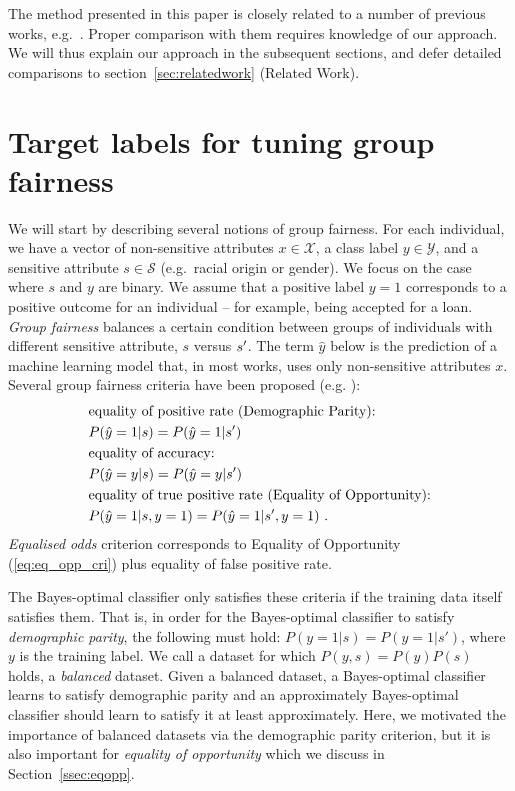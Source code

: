 The method presented in this paper is closely related to a number of previous works,
e.g.\ \citet{kamiran2012data,calders2010three}.
Proper comparison with them requires knowledge of our approach.
We will thus explain our approach in the subsequent sections, and defer detailed comparisons to section~\ref{sec:relatedwork} (Related Work).

\section{Target labels for tuning group fairness}
We will start by describing several notions of group fairness.
For each individual, we have a vector of non-sensitive attributes $x\in\mathcal{X}$, a class label $y\in\mathcal{Y}$, and a sensitive attribute $s\in\mathcal{S}$ (e.g.\ racial origin or gender).
%
We focus on the case where $s$ and $y$ are binary. 
%
We assume that a positive label $y=1$ corresponds to a positive outcome for an individual -- for example, being accepted for a loan.
%
%
\emph{Group fairness} balances a certain condition between groups of individuals with different sensitive attribute, $s$ versus $s\sp{\prime}$. 
%
The term $\hat{y}$ below is the prediction of a machine learning model that,
in most works, uses only non-sensitive attributes $x$.
%
Several group fairness criteria have been proposed (e.g. \cite{zafar2017fairnesstreatment,chouldechova2017fair,hardt2016equality}):
\begin{align}
& \text{equality of positive rate (Demographic Parity):}\nonumber\\
& P(\hat{y}=1|s)=P(\hat{y}=1|s\sp{\prime}) \label{eq:eq_dem_par}\\
& \text{equality of accuracy:}\nonumber\\
& P(\hat{y}=y|s)=P(\hat{y}=y|s\sp{\prime}) \\
& \text{equality of true positive rate (Equality of Opportunity):} \nonumber\\
& P(\hat{y}=1|s,y=1)=P(\hat{y}=1|s\sp{\prime},y=1)  \label{eq:eq_opp_cri}~.
\end{align}
\emph{Equalised odds} criterion corresponds to Equality of Opportunity (\ref{eq:eq_opp_cri}) plus equality of false positive rate.

The Bayes-optimal classifier only satisfies these criteria if the training data itself satisfies them.
That is, in order for the Bayes-optimal classifier to satisfy \emph{demographic parity}, the following must hold:
$P(y=1|s) = P(y=1|s\prime)$, where $y$ is the training label.
We call a dataset for which $P(y, s)=P(y)P(s)$ holds, a \emph{balanced} dataset.
Given a balanced dataset, a Bayes-optimal classifier learns to satisfy demographic parity
and an approximately Bayes-optimal classifier should learn to satisfy it at least approximately.
Here, we motivated the importance of balanced datasets via the demographic parity criterion,
but it is also important for \emph{equality of opportunity} which we discuss in Section~\ref{ssec:eqopp}.

